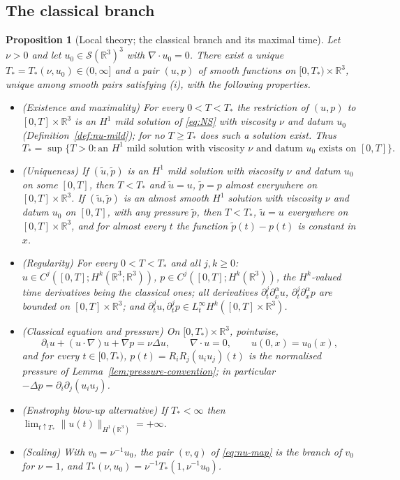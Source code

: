 \documentclass[11pt]{article}
\newtheorem{proposition}[theorem]{Proposition}
\theoremstyle{definition}
\theoremstyle{plain}
\newcommand{\R}{\mathbb R}
\newcommand{\norm}[1]{\lVert #1\rVert}
\begin{document}
\subsection{The classical branch}

\begin{proposition}[Local theory; the classical branch and its maximal time]
\label{prop:localtheory}
Let $\nu>0$ and let $u_0\in\mathcal S(\R^3)^3$ with $\nabla\cdot u_0=0$.
There exist a unique $T_*=T_*(\nu,u_0)\in(0,\infty]$ and a pair $(u,p)$ of
smooth functions on $[0,T_*)\times\R^3$, unique among smooth pairs
satisfying (i), with the following properties.
\begin{itemize}
\item[(i)] (Existence and maximality) For every $0<T<T_*$ the restriction
of $(u,p)$ to $[0,T]\times\R^3$ is an $H^1$ mild solution of \eqref{eq:NS}
with viscosity $\nu$ and datum $u_0$ (Definition~\ref{def:nu-mild}); for
no $T\geq T_*$ does such a solution exist.  Thus
\[
 T_*=\sup\{T>0:\text{an $H^1$ mild solution with viscosity $\nu$ and
 datum $u_0$ exists on }[0,T]\}.
\]
\item[(ii)] (Uniqueness) If $(\tilde u,\tilde p)$ is an $H^1$ mild
solution with viscosity $\nu$ and datum $u_0$ on some $[0,T]$, then
$T<T_*$ and $\tilde u=u$, $\tilde p=p$ almost everywhere on
$[0,T]\times\R^3$.  If $(\tilde u,\tilde p)$ is an almost smooth $H^1$
solution with viscosity $\nu$ and datum $u_0$ on $[0,T]$, with any
pressure $\tilde p$, then $T<T_*$, $\tilde u=u$ everywhere on
$[0,T]\times\R^3$, and for almost every $t$ the function
$\tilde p(t)-p(t)$ is constant in $x$.
\item[(iii)] (Regularity) For every $0<T<T_*$ and all $j,k\geq0$:
$u\in C^j([0,T];H^k(\R^3;\R^3))$, $p\in C^j([0,T];H^k(\R^3))$, the
$H^k$-valued time derivatives being the classical ones; all derivatives
$\partial_t^j\partial_x^\alpha u$, $\partial_t^j\partial_x^\alpha p$ are
bounded on $[0,T]\times\R^3$; and $\partial_t^ju,\partial_t^jp\in
L^\infty_tH^k([0,T]\times\R^3)$.
\item[(iv)] (Classical equation and pressure) On $[0,T_*)\times\R^3$,
pointwise,
\[
 \partial_tu+(u\cdot\nabla)u+\nabla p=\nu\Delta u,\qquad\nabla\cdot u=0,
 \qquad u(0,x)=u_0(x),
\]
and for every $t\in[0,T_*)$, $p(t)=R_iR_j(u_iu_j)(t)$ is the normalised
pressure of Lemma~\ref{lem:pressure-convention}; in particular
$-\Delta p=\partial_i\partial_j(u_iu_j)$.
\item[(v)] (Enstrophy blow-up alternative) If $T_*<\infty$ then
$\lim_{t\uparrow T_*}\norm{u(t)}_{H^1(\R^3)}=+\infty$.
\item[(vi)] (Scaling) With $v_0=\nu^{-1}u_0$, the pair $(v,q)$ of
\eqref{eq:nu-map} is the branch of $v_0$ for $\nu=1$, and
$T_*(\nu,u_0)=\nu^{-1}T_*(1,\nu^{-1}u_0)$.
\end{itemize}
\end{proposition}
\end{document}
